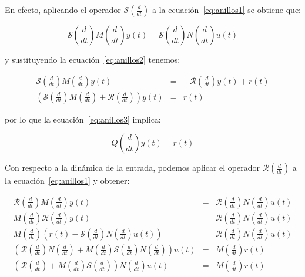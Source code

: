             En efecto, aplicando el operador $\mathcal{S} \left( \frac{d}{dt} \right)$ a la ecuación~\ref{eq:anillos1} se obtiene que:

            \begin{equation*}
                \mathcal{S} \left( \frac{d}{dt} \right) M \left( \frac{d}{dt} \right) y(t) = \mathcal{S} \left( \frac{d}{dt} \right) N \left( \frac{d}{dt} \right) u(t)
            \end{equation*}

            y sustituyendo la ecuación~\ref{eq:anillos2} tenemos:

            \begin{eqnarray*}
                \mathcal{S} \left( \frac{d}{dt} \right) M \left( \frac{d}{dt} \right) y(t) & = & -\mathcal{R} \left( \frac{d}{dt} \right) y(t) + r(t) \\
                \left( \mathcal{S} \left( \frac{d}{dt} \right) M \left( \frac{d}{dt} \right) + \mathcal{R} \left( \frac{d}{dt} \right) \right) y(t) & = & r(t)
            \end{eqnarray*}

            por lo que la ecuación~\ref{eq:anillos3} implica:

            \begin{equation*}
                Q \left( \frac{d}{dt} \right) y(t) = r(t)
            \end{equation*}

            Con respecto a la dinámica de la entrada, podemos aplicar el operador $\mathcal{R} \left( \frac{d}{dt} \right)$ a la ecuación~\ref{eq:anillos1} y obtener:

            \begin{eqnarray*}
                \mathcal{R} \left( \frac{d}{dt} \right) M \left( \frac{d}{dt} \right) y(t) & = & \mathcal{R} \left( \frac{d}{dt} \right) N \left( \frac{d}{dt} \right) u(t) \\
                M \left( \frac{d}{dt} \right) \mathcal{R} \left( \frac{d}{dt} \right) y(t) & = & \mathcal{R} \left( \frac{d}{dt} \right) N \left( \frac{d}{dt} \right) u(t) \\
                M \left( \frac{d}{dt} \right) \left( r(t) - \mathcal{S} \left( \frac{d}{dt} \right) N \left( \frac{d}{dt} \right) u(t) \right) & = & \mathcal{R} \left( \frac{d}{dt} \right) N \left( \frac{d}{dt} \right) u(t) \\
                \left( \mathcal{R} \left( \frac{d}{dt} \right) N \left( \frac{d}{dt} \right) + M \left( \frac{d}{dt} \right) \mathcal{S} \left( \frac{d}{dt} \right) N \left( \frac{d}{dt} \right) \right) u(t) & = & M \left( \frac{d}{dt} \right) r(t) \\
                \left( \mathcal{R} \left( \frac{d}{dt} \right) + M \left( \frac{d}{dt} \right) \mathcal{S} \left( \frac{d}{dt} \right) \right) N \left( \frac{d}{dt} \right) u(t) & = & M \left( \frac{d}{dt} \right) r(t) \\
            \end{eqnarray*}

